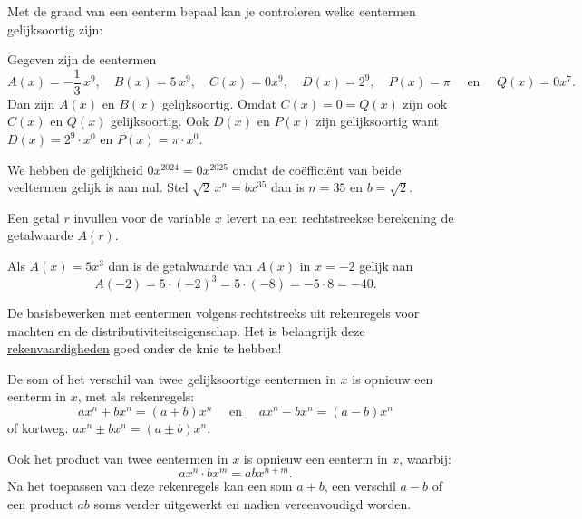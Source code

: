 \documentclass{ximera}
\begin{document}
Met de graad van een eenterm bepaal kan je controleren welke eentermen gelijksoortig zijn: 
\begin{example} 
Gegeven zijn de eentermen
\[
A(x) = -\frac{1}{3}\,x^9, \quad B(x) = 5\,x^9, \quad C(x) = 0x^9, \quad D(x) = 2^9, \quad P(x) = \pi \quad \text{ en } \quad Q(x) = 0 x^7.
\]
Dan zijn $A(x)$ en $B(x)$ gelijksoortig. Omdat $C(x) = 0 = Q(x)$ zijn ook $C(x)$ en $Q(x)$ gelijksoortig. 
Ook $D(x)$ en $P(x)$ zijn gelijksoortig want $D(x) = 2^9 \cdot x^0$ en $P(x) = \pi \cdot x^0$.  
\end{example} 

\begin{example} 
We hebben de gelijkheid $0x^{2024} = 0x^{2025}$ omdat de coëfficiënt van beide veeltermen gelijk is aan nul. Stel $\sqrt{2}\,x^n = bx^{35}$ dan is $n = 35$ en $b = \sqrt{2}$.
\end{example} 


Een getal \(r\) invullen voor de variable \(x\) levert na een rechtstreekse berekening de getalwaarde $A(r)$. 
\begin{example} 
Als $A(x) = 5x^3$ dan is de getalwaarde van $A(x)$ in $x = -2$ gelijk aan 
\[
A(-2) = 5 \cdot (-2)^3 = 5 \cdot (-8) = - 5 \cdot 8 = -40.
\]
\end{example} 



De basisbewerken met eentermen volgens rechtstreeks uit rekenregels voor machten en de distributiviteitseigenschap. Het is belangrijk deze \href{https://wiskunde.opmaat.org/wiskundeplan/rekenvaardigheden/rekenvaardigheden/rekenvaardigheden_inleiding}{rekenvaardigheden} goed onder de knie te hebben!  


\begin{proposition}
	
De som of het verschil van twee gelijksoortige eentermen in $x$ is opnieuw een eenterm in $x$, met als rekenregels:
\[
ax^n + bx^n = (a+b)x^n \quad \text{ en } \quad ax^n - bx^n = (a-b)x^n
\]
of kortweg: $ax^n \pm bx^n = (a\pm b)x^n$. 

Ook het product van twee eentermen in $x$ is opnieuw een eenterm in $x$, waarbij:
\[
ax^n \cdot bx^m = abx^{n+m}.
\]
Na het toepassen van deze rekenregels kan een som $a+b$, een verschil $a-b$ of een product $ab$ soms verder uitgewerkt en nadien vereenvoudigd worden.

\end{proposition}
\end{document}
